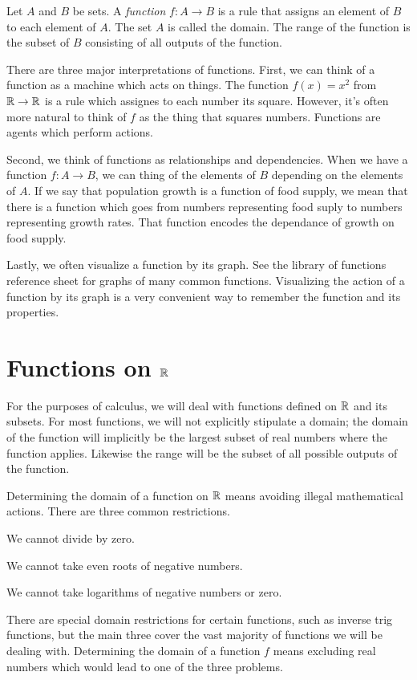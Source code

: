 \documentclass[fleqn]{report}
\begin{document}
Let $A$ and $B$ be sets. 
A \emph{function} $f: A \rightarrow B$ is a rule that assigns an
element of $B$ to each element of $A$. The set $A$ is called
the domain. The range of the function is the subset of $B$
consisting of all outputs of the function.

There are three major interpretations of functions.
First, we can think of a function as a machine which acts on
things. The function $f(x) = x^2$ from $\mathbb{R} \rightarrow
\mathbb{R}$ is a rule which assignes to each number its square.
However, it's often more natural to think of $f$ as the thing that
squares numbers. Functions are agents which
perform actions. 

Second, we think of functions as relationships and
dependencies. When we have a function $f: A \rightarrow B$,
we can thing of the elements of $B$ depending on the elements
of $A$. If we say that population growth is a function of
food supply, we mean that there is a function which goes from
numbers representing food suply to numbers representing growth
rates. That function encodes the dependance of growth on food
supply.

Lastly, we often visualize a function by its graph. See the
library of functions reference sheet for graphs of many common
functions. Visualizing the action of a function by its graph is
a very convenient way to remember the function and its
properties.

\section*{Functions on $\mathbb{R}$}

For the purposes of calculus, we will deal with functions
defined on $\mathbb{R}$ and its subsets. For most functions, we will
not explicitly stipulate a domain; the domain of the function
will implicitly be the largest subset of real numbers where
the function applies. Likewise the range will be the subset
of all possible outputs of the function.

Determining the domain of a function on $\mathbb{R}$ means avoiding
illegal mathematical actions. There are three common restrictions.
\begin{smallitemize}
\item We cannot divide by zero.
\item We cannot take even roots of negative numbers.
\item We cannot take logarithms of negative numbers or zero.
\end{smallitemize}
There are special domain restrictions for certain
functions, such as inverse trig functions, but the main three
cover the vast majority of functions we will be dealing with.
Determining the domain of a function $f$ means excluding real
numbers which would lead to one of the three problems.
\end{document}
